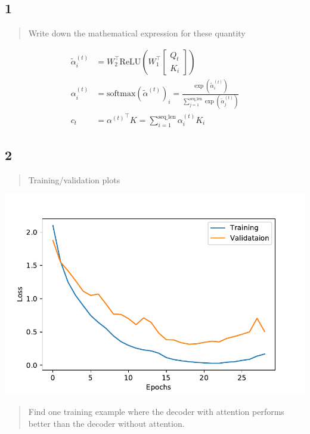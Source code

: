 \documentclass{article}
\begin{document}
\subsection*{1}

\begin{quote}
Write  down  the  mathematical  expression  for  these  quantity
\end{quote}

\begin{align*}
\tilde{\alpha}^{(t)}_i &= W_2^\intercal \textrm{ReLU} ( W_1^\intercal 
\begin{bmatrix}
Q_t \\ K_i
\end{bmatrix} 
)
\\
\alpha^{(t)}_i &= \textrm{softmax}(\tilde{\alpha}^{(t)})_i = \frac
{\exp(\tilde{\alpha}^{(t)}_i)}
{\sum_{j=1}^{\textrm{seq\_len}} \exp(\tilde{\alpha}^{(t)}_j) }
\\
c_t &= {\alpha^{(t)}}^\intercal K = \sum_{i=1}^{\textrm{seq\_len}} \alpha^{(t)}_i K_i
\end{align*}

\subsection*{2}

\begin{quote}
Training/validation plots 
\end{quote}

\includegraphics[width=\linewidth]{loss_additive_attention}

\begin{quote}
Find  one training example where the decoder with attention performs better than the decoder without attention.
\end{quote}
\end{document}
